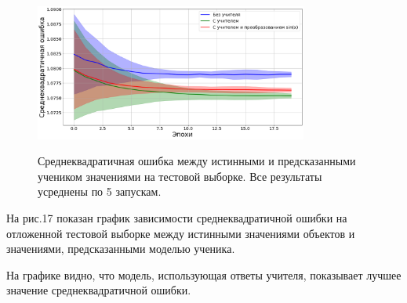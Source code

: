\begin{figure}[h!t]\center
{\includegraphics[width=0.8\textwidth]{results/reg_sin_loss}}\\
\caption{Среднеквадратичная ошибка между истинными и предсказанными учеником значениями на тестовой выборке. Все результаты усреднены по 5 запускам.}
\end{figure}

На рис.17 показан график зависимости среднеквадратичной ошибки на отложенной тестовой выборке между истинными значениями объектов и значениями, предсказанными моделью ученика.

На графике видно, что модель, использующая ответы учителя, показывает лучшее значение среднеквадратичной ошибки.

\begin{table}[h!t]
\begin{center}
\caption{Качество моделей}
\label{table_18}
\end{center}
\end{table}

